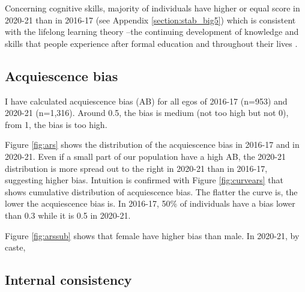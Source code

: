 \documentclass[a4paper, 12pt, onecolumn]{article}
\begin{document}
Concerning cognitive skills, majority of individuals have higher or equal score in 2020-21 than in 2016-17 (see Appendix \ref{section:stab_big5}) which is consistent with the lifelong learning theory --the continuing development of knowledge and skills that people experience after formal education and throughout their lives \citep{London2011}.


	\subsection{Acquiescence bias}
I have calculated acquiescence bias (AB) for all egos of 2016-17 (n=953) and 2020-21 (n=1,316).
Around 0.5, the bias is medium (not too high but not 0), from 1, the bias is too high.



Figure \ref{fig:ars} shows the distribution of the acquiescence bias in 2016-17 and in 2020-21.
Even if a small part of our population have a high AB, the 2020-21 distribution is more spread out to the right in 2020-21 than in 2016-17, suggesting higher bias.
Intuition is confirmed with Figure \ref{fig:curvears} that shows cumulative distribution of acquiescence bias. 
The flatter the curve is, the lower the acquiescence bias is.
In 2016-17, 50\% of individuals have a bias lower than 0.3 while it is 0.5 in 2020-21.

Figure \ref{fig:arssub} shows that female have higher bias than male. 
In 2020-21, by caste, 


	\subsection{Internal consistency}
\end{document}
